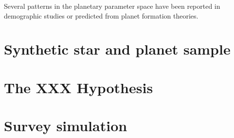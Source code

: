 \documentclass[twocolumn]{aastex631}
\begin{document}
%
%



Several patterns in the planetary parameter space have been reported in demographic studies or predicted from planet formation theories.


\section{Synthetic star and planet sample}

\section{The XXX Hypothesis}

\section{Survey simulation}
\end{document}
